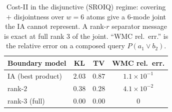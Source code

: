 \documentclass[letterpaper]{article}
\begin{document}
\begin{table}[t]\centering
\caption{Cost-II in the disjunctive (SROIQ) regime: covering $+$ disjointness over $w{=}6$ atoms give a $6$-mode joint the IA cannot represent. A rank-$r$ separator message is exact at full rank $3$ of the joint. ``WMC rel.\ err.'' is the relative error on a composed query $P(a_1\vee b_2)$.}\label{tab:disj}
\footnotesize
\setlength{\tabcolsep}{3pt}
\begin{tabular}{@{}lccc@{}}
\toprule
Boundary model & KL & TV & WMC rel.\ err.\\
\midrule
IA (best product) & $2.03$ & $0.87$ & $1.1{\times}10^{-1}$\\
rank-$2$ & $0.38$ & $0.28$ & $4.1{\times}10^{-2}$\\
rank-$3$ (full) & $0.00$ & $0.00$ & $0$\\
\bottomrule
\end{tabular}
\end{table}
\end{document}
